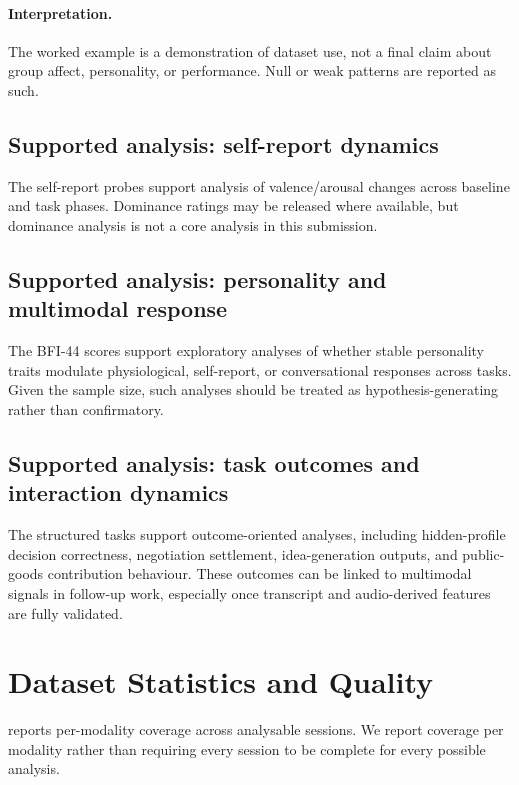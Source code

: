 \documentclass{article}
\begin{document}
\paragraph{Interpretation.}
The worked example is a demonstration of dataset use, not a final claim about
group affect, personality, or performance.
Null or weak patterns are reported as such.

\subsection{Supported analysis: self-report dynamics}

The self-report probes support analysis of valence/arousal changes across
baseline and task phases.
Dominance ratings may be released where available, but dominance analysis is
not a core analysis in this submission.

\subsection{Supported analysis: personality and multimodal response}

The BFI-44 scores support exploratory analyses of whether stable personality
traits modulate physiological, self-report, or conversational responses across
tasks.
Given the sample size, such analyses should be treated as hypothesis-generating
rather than confirmatory.

\subsection{Supported analysis: task outcomes and interaction dynamics}

The structured tasks support outcome-oriented analyses, including
hidden-profile decision correctness, negotiation settlement, idea-generation
outputs, and public-goods contribution behaviour.
These outcomes can be linked to multimodal signals in follow-up work,
especially once transcript and audio-derived features are fully validated.

\section{Dataset Statistics and Quality}
\label{sec:stats}

 reports per-modality coverage across analysable sessions.
We report coverage per modality rather than requiring every session to be
complete for every possible analysis.
\end{document}

